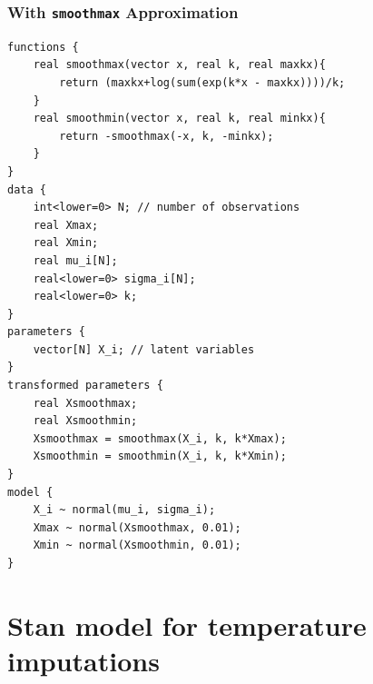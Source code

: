 \documentclass[letter]{article}
\begin{document}
        \subsubsection{\texorpdfstring{With \texttt{smoothmax} Approximation}{With smoothmax Approximation}}\label{with-smoothmax-approximation}
    


        \begin{verbatim}
functions {
    real smoothmax(vector x, real k, real maxkx){
        return (maxkx+log(sum(exp(k*x - maxkx))))/k;
    }
    real smoothmin(vector x, real k, real minkx){
        return -smoothmax(-x, k, -minkx);
    }
}
data {
    int<lower=0> N; // number of observations
    real Xmax;
    real Xmin;
    real mu_i[N];
    real<lower=0> sigma_i[N];
    real<lower=0> k;
}
parameters {
    vector[N] X_i; // latent variables
}
transformed parameters {
    real Xsmoothmax;
    real Xsmoothmin;
    Xsmoothmax = smoothmax(X_i, k, k*Xmax);
    Xsmoothmin = smoothmin(X_i, k, k*Xmin);
}
model {
    X_i ~ normal(mu_i, sigma_i);
    Xmax ~ normal(Xsmoothmax, 0.01);
    Xmin ~ normal(Xsmoothmin, 0.01);
}
\end{verbatim}
    


        \section{Stan model for temperature imputations}\label{stan-model-for-temperature-imputations}
    
\end{document}
